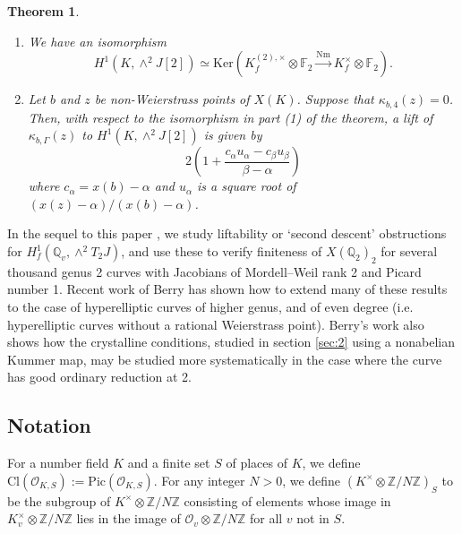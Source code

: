 \documentclass[11pt]{amsart}
\def\Z{\mathbb Z}
\def\Q{\mathbb Q}
\theoremstyle{plain}
\newtheorem{theorem}{Theorem}
\newtheorem{proposition}{Proposition}
\theoremstyle{definition}
\DeclareMathOperator{\Gal}{Gal}
\newcommand{\Cl}{\mathrm{Cl}}
\newcommand{\Pic}{\mathrm{Pic}}
\newcommand{\Ind}{\mathrm{Ind}}
\newcommand{\Nm}{\mathrm{Nm}}
\newcommand{\Ker}{\mathrm{Ker}}
\begin{document}
\begin{theorem}
\begin{enumerate}
\item We have an isomorphism
\[
H^1 (K,\wedge ^2 J[2]) \simeq \Ker (K_f ^{(2),\times } \otimes \mathbb{F}_2 \stackrel{\Nm }{\longrightarrow }K_f ^\times \otimes \mathbb{F}_2 ).
\]
\item Let $b$ and $z$ be non-Weierstrass points of $X(K)$. Suppose that $\kappa _{b,4}(z)=0$. Then, with respect to the isomorphism in part (1) of the theorem, a lift of $\kappa _{b,\Gamma }(z)$ to $H^1 (K,\wedge ^2 J[2])$ is given by 
\[
2\left( 1+\frac{c_{\alpha }u_{\alpha }-c_{\beta }u_{\beta }}{\beta -\alpha } \right)
\]
where $c_{\alpha }=x(b)-\alpha $ and $u_{\alpha }$ is a square root of $(x(z)-\alpha )/(x(b)-\alpha )$.
\end{enumerate}
\end{theorem}

In the sequel to this paper \cite{BKdescent2}, we study liftability or `second descent' obstructions for $H^1 _f (\Q _v ,\wedge ^2 T_2 J)$, and use these to verify finiteness of $X(\Q _2 )_2 $ for several thousand genus 2 curves with Jacobians of Mordell--Weil rank 2 and Picard number 1. Recent work of Berry \cite{berry} has shown how to extend many of these results to the case of hyperelliptic curves of higher genus, and of even degree (i.e. hyperelliptic curves without a rational Weierstrass point). Berry's work also shows how the crystalline conditions, studied in section \ref{sec:2} using a nonabelian Kummer map, may be studied more systematically in the case where the curve has good ordinary reduction at 2.
\subsection{Notation}
For a number field $K$ and a finite set $S$ of places of $K$, we define $\Cl (\mathcal{O}_{K,S}):=\Pic (\mathcal{O}_{K,S})$. For any integer $N>0$, we define $(K^\times \otimes \mathbb{Z}/N\mathbb{Z})_S $ to be the subgroup of $K^\times \otimes\mathbb{Z}/N\mathbb{Z}$ consisting of elements whose image in $K_v ^\times \otimes \mathbb{Z}/N\mathbb{Z}$ lies in the image of $\mathcal{O}_v \otimes \mathbb{Z}/N\Z $ for all $v$ not in $S$.
\end{document}
